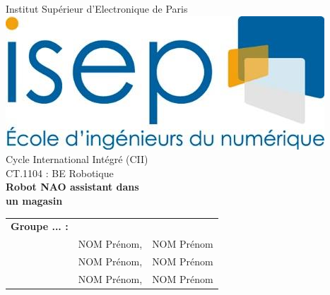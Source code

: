 \documentclass[12pt,a4paper,twoside]{report}
\begin{document}
\dominitoc

\begin{center}
{\Huge{Institut Supérieur d'Electronique de Paris}} \\
\vspace{0.5cm}
\includegraphics[scale=0.4]{ISEP.png} \\
\vspace{0.7cm}
{\Large{Cycle International Intégré (CII)}} \\
\vspace{0.7cm}
{\Large{CT.1104 : BE Robotique}} \\
\vspace{0.7cm}
{\Huge{\textbf{Robot NAO assistant dans}}} \\
\vspace{0.35cm}
{\Huge{\textbf{un magasin}}} \\
\vspace{0.3cm}
\begin{table}[h]
\begin{tabular}{cll}
\textbf{Groupe ... :} &  &  \\
\vspace{0.2cm}
 & NOM Prénom, & NOM Prénom \\
\vspace{0.2cm}
 & NOM Prénom, & NOM Prénom \\
 & NOM Prénom, & NOM Prénom \\
\end{tabular}
\end{table}
\vspace{0.2cm}

\end{center}
\end{document}

